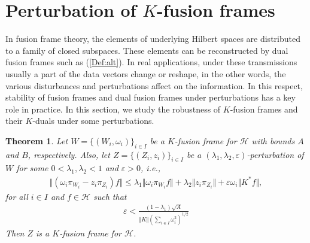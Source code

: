 \documentclass{birkjour}
\newtheorem{thm}{Theorem}[section]
\theoremstyle{definition}
\newtheorem{defn}[thm]{Definition}
\theoremstyle{remark}
\numberwithin{equation}{section}
\begin{document}
\section{Perturbation of $K$-fusion frames}


\smallskip
\goodbreak
In fusion  frame theory, the elements of underlying Hilbert spaces are distributed to a family of closed subspaces. These elements can be reconstructed by dual fusion frames  such as (\ref{Def:alt}).
 In real
applications, under these transmissions usually a part of the data vectors
change or reshape, in the other words, the various disturbances and perturbations  affect on the information.
In this respect,  stability of fusion frames and dual fusion frames  under perturbations has a key role in
practice.  
In this
section, we study the  robustness of $K$-fusion frames and their $K$-duals under some perturbations.
 \begin{thm}\label{per1} Let $W=\lbrace
(W_{i},\omega_{i})\rbrace_{i\in I}$ be a $K$-fusion frame for $\mathcal{H}$
with bounds $A$ and $B$, respectively. Also, let $Z=\lbrace (Z_{i},z_{i})\rbrace_{i\in I}$ be a $(\lambda_{1},
\lambda_{2},\varepsilon)$-perturbation of $W$  for some
 $0 <
\lambda_{1}, \lambda_{2} < 1$ and $\varepsilon >0$, i.e.,
\begin{eqnarray*} \Vert
(\omega_{i}\pi_{W_{i}}-z_{i}\pi_{Z_{i}})f\Vert \leq \lambda_{1}\Vert
\omega_{i}\pi_{W_{i}}f\Vert+\lambda_{2}\Vert
z_{i}\pi_{Z_{i}}\Vert+\varepsilon \omega_{i}\Vert K^{*}f\Vert,
\end{eqnarray*} for all $i\in I$ and $f\in \mathcal{H}$
 such that
\begin{eqnarray}\label{varepsilon}
\varepsilon < \frac{(1-\lambda_{1})\sqrt{A}}{\Vert K\Vert(\sum_{i\in
I}\omega_{i}^{2})^{1/2}}
\end{eqnarray}
Then $Z$ is a $K$-fusion frame
for $\mathcal{H}$. \end{thm}
\end{document}

